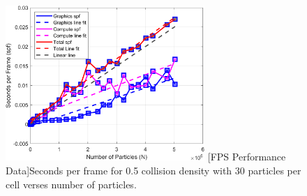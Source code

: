 \begin{figure}[h]
\centering
\includegraphics[width=2.97in]{../plots/Perf_VCUBE021.png}
[FPS Performance Data]{Seconds per frame for 0.5 collision density with 30 particles per cell verses number of particles.}
\label{fig:Perf_VCUBE02}
\end{figure}
